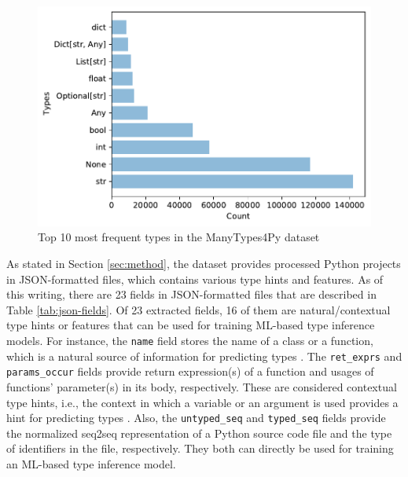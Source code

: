 \documentclass[10pt, conference]{IEEEtran}
\begin{document}
\begin{figure}[!t]
	\centering
	\includegraphics[width=\linewidth]{figs/top-10-most-frequent-types.pdf}
	\caption{Top 10 most frequent types in the ManyTypes4Py dataset}
	\label{fig:top-10-types}
\end{figure}

As stated in Section \ref{sec:method}, the dataset provides processed Python projects in JSON-formatted files, which contains various type hints and features. As of this writing, there are 23 fields in JSON-formatted files that are described in Table \ref{tab:json-fields}. Of 23 extracted fields, 16 of them are natural/contextual type hints or features that can be used for training ML-based type inference models. For instance, the \texttt{name} field stores the name of a class or a function, which is a natural source of information for predicting types \cite{malik2019nl2type}. The \texttt{ret\_exprs} and \texttt{params\_occur} fields provide return expression(s) of a function and usages of functions' parameter(s) in its body, respectively. These are considered contextual type hints, i.e., the context in which a variable or an argument is used provides a hint for predicting types \cite{pradel2019typewriter}. Also, the \texttt{untyped\_seq} and \texttt{typed\_seq} fields provide the normalized seq2seq representation of a Python source code file and the type of identifiers in the file, respectively. They both can directly be used for training an ML-based type inference model.
\end{document}
